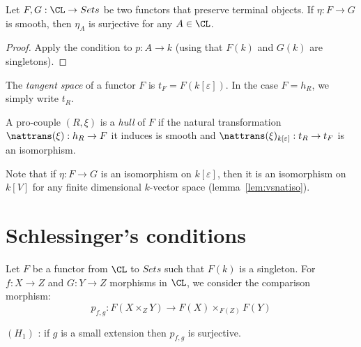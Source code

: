 \begin{lemma}
  \label{lem:surj_of_smooth}
  \leanok
  Let $F, G : \CL \to Sets$ be two functors that preserve terminal objects.
  If $\eta : F \to G$ is smooth,
  then $\eta_A$ is surjective for any $A \in \CL$.
\end{lemma}

\begin{proof}
  \leanok
  Apply the condition to $p : A \to k$ (using that $F(k)$ and $G(k)$
  are singletons).
\end{proof}

\begin{definition}
  \label{def:tangentSpace}
  \leanok
  The \emph{tangent space} of a functor $F$ is $t_F = F(k[\varepsilon])$.
  In the case $F = h_R$, we simply write $t_R$.
\end{definition}

\begin{definition}
  \label{def:IsHull}
  \leanok
  A pro-couple $(R, \xi)$ is a \emph{hull} of $F$ if the natural
  transformation
  $\nattrans(\xi) : h_R \to F$ it induces
  is smooth and $\nattrans(\xi)_{k[\varepsilon]} : t_R \to t_F$
  is an isomorphism.
\end{definition}

Note that if $\eta : F \to G$ is an isomorphism on $k[\varepsilon]$,
then it is an isomorphism on $k[V]$ for any finite dimensional $k$-vector space
(lemma~\ref{lem:vsnatiso}).

\section{Schlessinger's conditions}

Let $F$ be a functor from $\CL$ to $Sets$ such that $F(k)$ is a singleton.
For $f : X \to Z$ and $G : Y \to Z$ morphisms in
 $\CL$, we consider the comparison morphism:
\begin{equation}
  \label{eq:pfg}
  p_{f, g} : F(X \times_Z Y) \to F(X) \times_{F(Z)} F(Y)
\end{equation}

\begin{definition}
  \label{def:H1}
  \leanok
  $(H_1)$ : if $g$ is a small extension then $p_{f, g}$ is surjective.
\end{definition}

